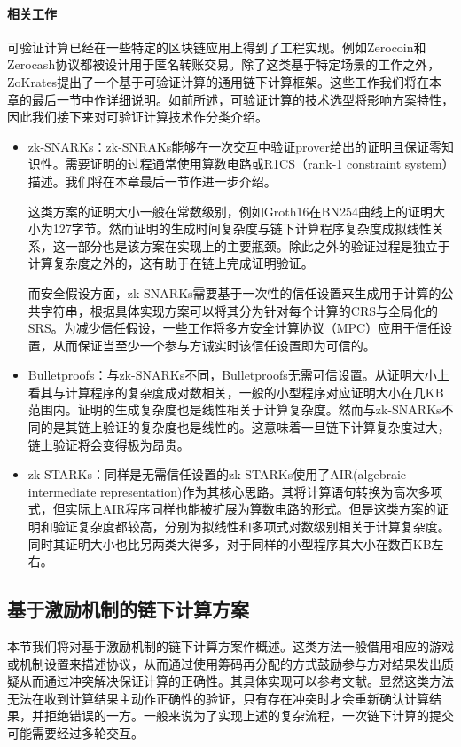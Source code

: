 \paragraph{相关工作}
可验证计算已经在一些特定的区块链应用上得到了工程实现。例如Zerocoin\cite{6547123}和Zerocash\cite{6956581}协议都被设计用于匿名转账交易。除了这类基于特定场景的工作之外，ZoKrates\cite{8726497}提出了一个基于可验证计算的通用链下计算框架。这些工作我们将在本章的最后一节中作详细说明。如前所述，可验证计算的技术选型将影响方案特性，因此我们接下来对可验证计算技术作分类介绍。
\begin{itemize}
    \setlength{\itemsep}{0pt}
    \setlength{\parsep}{0pt}
    \setlength{\parskip}{0pt}
    \item zk-SNARKs：zk-SNRAKs能够在一次交互中验证prover给出的证明且保证零知识性。需要证明的过程通常使用算数电路\cite{10.1145/2856449}或R1CS\cite{184425}（rank-1 constraint system）描述。我们将在本章最后一节作进一步介绍。
    
    这类方案的证明大小一般在常数级别，例如Groth16\cite{cryptoeprint:2016/260}在BN254曲线上的证明大小为127字节\cite{cryptoeprint:2005/133}。然而证明的生成时间复杂度与链下计算程序复杂度成拟线性关系，这一部分也是该方案在实现上的主要瓶颈。除此之外的验证过程是独立于计算复杂度之外的，这有助于在链上完成证明验证。

    而安全假设方面，zk-SNARKs需要基于一次性的信任设置来生成用于计算的公共字符串，根据具体实现方案可以将其分为针对每个计算的CRS与全局化的SRS。为减少信任假设，一些工作\cite{cryptoeprint:2017/1050, 7163032}将多方安全计算协议（MPC）应用于信任设置，从而保证当至少一个参与方诚实时该信任设置即为可信的。
    \item Bulletproofs：与zk-SNARKs不同，Bulletproofs\cite{8418611}无需可信设置。从证明大小上看其与计算程序的复杂度成对数相关，一般的小型程序对应证明大小在几KB范围内。证明的生成复杂度也是线性相关于计算复杂度。然而与zk-SNARKs不同的是其链上验证的复杂度也是线性的。这意味着一旦链下计算复杂度过大，链上验证将会变得极为昂贵。
    \item zk-STARKs：同样是无需信任设置的zk-STARKs\cite{cryptoeprint:2018/046}使用了AIR(algebraic intermediate representation)作为其核心思路。其将计算语句转换为高次多项式，但实际上AIR程序同样也能被扩展为算数电路的形式。但是这类方案的证明和验证复杂度都较高，分别为拟线性和多项式对数级别相关于计算复杂度。同时其证明大小也比另两类大得多，对于同样的小型程序其大小在数百KB左右。
\end{itemize}

\subsection{基于激励机制的链下计算方案}
本节我们将对基于激励机制的链下计算方案作概述。这类方法一般借用相应的游戏或机制设置来描述协议，从而通过使用筹码再分配的方式鼓励参与方对结果发出质疑从而通过冲突解决保证计算的正确性。其具体实现可以参考文献\cite{hurwicz_reiter_2006}。显然这类方法无法在收到计算结果主动作正确性的验证，只有存在冲突时才会重新确认计算结果，并拒绝错误的一方。一般来说为了实现上述的复杂流程，一次链下计算的提交可能需要经过多轮交互。

